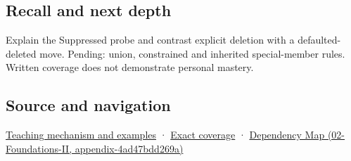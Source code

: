 \subsection{Recall and next depth}\label{recall-and-next-depth}

Explain the Suppressed probe and contrast explicit deletion with a defaulted-deleted move. Pending: union, constrained and inherited special-member rules. Written coverage does not demonstrate personal mastery.

\subsection{Source and navigation}\label{source-and-navigation}

\href{Continuous\%20Notes/Computing\%20Foundations\%20-\%20From\%20Bits\%20to\%20C++\%20and\%20Systems\%20APIs\#Let\%20the\%20compiler\%20compose\%20the\%20operations}{Teaching mechanism and examples} · \hyperref[appendix-fd090d982a15]{Exact coverage} · \href{}{Dependency Map (02-Foundations-II, appendix-4ad47bdd269a)}

